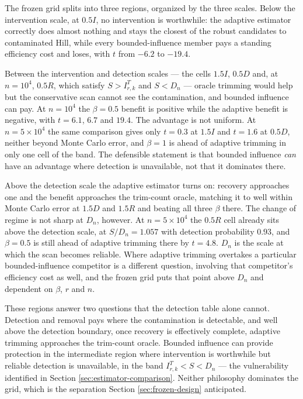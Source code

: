 \documentclass[11pt]{article}
\begin{document}
The frozen grid splits into three regions, organized by the three scales.
Below the intervention scale, at $0.5I$, no intervention is worthwhile: the
adaptive estimator correctly does almost nothing and stays the closest of the
robust candidates to contaminated Hill, while every bounded-influence member
pays a standing efficiency cost and loses, with $t$ from $-6.2$ to $-19.4$.

Between the intervention and detection scales --- the cells $1.5I$, $0.5D$ and,
at $n=10^4$, $0.5R$, which satisfy $S>I^{T}_{r,k}$ and $S<D_n$ --- oracle trimming
would help but the conservative scan cannot see the contamination, and bounded
influence can pay.  At $n=10^4$ the $\beta=0.5$ benefit is positive while the
adaptive benefit is negative, with $t=6.1$, $6.7$ and $19.4$.  The advantage is
not uniform.  At $n=5\times10^4$ the same comparison gives only $t=0.3$ at
$1.5I$ and $t=1.6$ at $0.5D$, neither beyond Monte Carlo error, and $\beta=1$
is ahead of
adaptive trimming in only one cell of the band.  The defensible statement is
that bounded influence \emph{can} have an advantage where detection is
unavailable, not that it dominates there.

Above the detection scale the adaptive estimator turns on: recovery approaches
one and the benefit approaches the trim-count oracle, matching it to well
within Monte Carlo error at $1.5D$ and $1.5R$ and beating all three $\beta$
there.
The change of regime is not sharp at $D_n$, however.  At $n=5\times10^4$ the
$0.5R$ cell already sits above the detection scale, at $S/D_n=1.057$ with
detection probability $0.93$, and $\beta=0.5$ is still ahead of adaptive
trimming there by $t=4.8$.  $D_n$ is the scale at which the scan becomes
reliable.  Where adaptive trimming overtakes a particular bounded-influence
competitor is a different question, involving that competitor's efficiency cost
as well, and the frozen grid puts that point above $D_n$ and dependent on
$\beta$, $r$ and $n$.





These regions answer two questions that the detection table alone cannot.
Detection and removal pays where the contamination is detectable, and well
above the detection boundary, once recovery is effectively complete, adaptive
trimming approaches the trim-count oracle.  Bounded influence can provide
protection in the intermediate region where intervention is worthwhile but
reliable detection is unavailable, in the band $I^{T}_{r,k}<S<D_n$ --- the
vulnerability identified in Section \ref{sec:estimator-comparison}.  Neither
philosophy dominates the grid, which is the separation Section
\ref{sec:frozen-design} anticipated.
\end{document}
